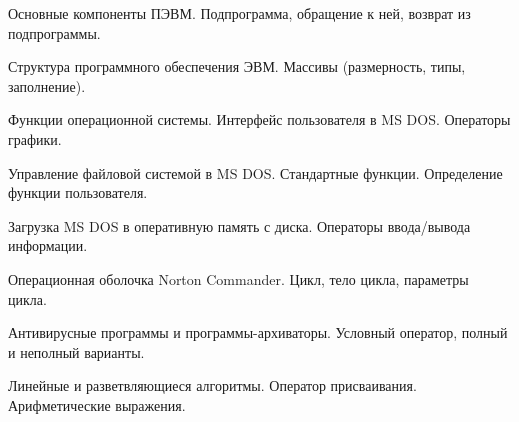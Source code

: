 \documentclass[
	14pt,
	a4paper,
	]
	{scrartcl}
\begin{document}
\shapk
{}
\setcounter{zad}{0}

\vfill
\z Основные компоненты ПЭВМ.
 \vfill
\z Подпрограмма, обращение к ней, возврат из подпрограммы. \vfill

\vfill

\newpage


\shapk
{}
\setcounter{zad}{0}

\vfill
\z Структура программного обеспечения ЭВМ.
 \vfill
\z Массивы (размерность, типы, заполнение). 
 \vfill

\vfill

\newpage


\shapk
{}
\setcounter{zad}{0}

\vfill
\z Функции операционной системы. Интерфейс пользователя в MS DOS.
 \vfill
\z Операторы графики.
 \vfill

\vfill

\newpage


\shapk
{}
\setcounter{zad}{0}

\vfill
\z Управление файловой системой в MS DOS.
 \vfill
\z Стандартные функции. Определение функции пользователя. 
 \vfill

\vfill

\newpage


\shapk
{}
\setcounter{zad}{0}

\vfill
\z Загрузка MS DOS в оперативную память с диска.
 \vfill
\z Операторы ввода/вывода информации. 
 \vfill

\vfill

\newpage


\shapk
{}
\setcounter{zad}{0}

\vfill
\z Операционная оболочка Norton Commander.
 \vfill
\z Цикл, тело цикла, параметры цикла. 
 \vfill

\vfill

\newpage


\shapk
{}
\setcounter{zad}{0}

\vfill
\z Антивирусные программы и программы-архиваторы.
 \vfill
\z Условный оператор, полный и неполный варианты. 
 \vfill

\vfill

\newpage


\shapk
{}
\setcounter{zad}{0}

\vfill
\z Линейные и разветвляющиеся алгоритмы.
 \vfill
\z Оператор присваивания. Арифметические выражения. 
 \vfill
\end{document}
